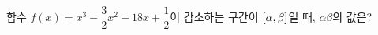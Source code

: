 함수 $f(x)=x^3-\dfrac{3}{2}x^2-18x+\dfrac{1}{2}$이 감소하는 구간이 $[\alpha{,}\mkern3mu\mathopen{}\beta]$일 때, $\alpha\beta$의 값은?
